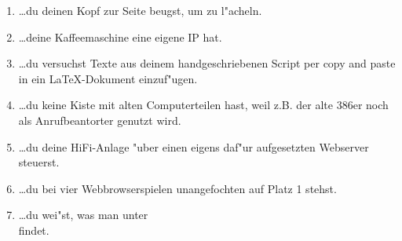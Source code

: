 \begin{enumerate}
\item \ldots du deinen Kopf zur Seite beugst, um zu l"acheln.
\item \ldots deine Kaffeemaschine eine eigene IP hat.
\item \ldots du versuchst Texte aus deinem handgeschriebenen Script per copy and paste in ein \LaTeX-Dokument einzuf"ugen.
\item \ldots du keine Kiste mit alten Computerteilen hast, weil z.B. der alte 386er noch als Anrufbeantorter genutzt wird.
\item \ldots du deine HiFi-Anlage "uber einen eigens daf"ur aufgesetzten Webserver steuerst.
\item \ldots du bei vier Webbrowserspielen unangefochten auf Platz 1 stehst.
\item \ldots du wei"st, was man unter\\  findet.
\end{enumerate}
